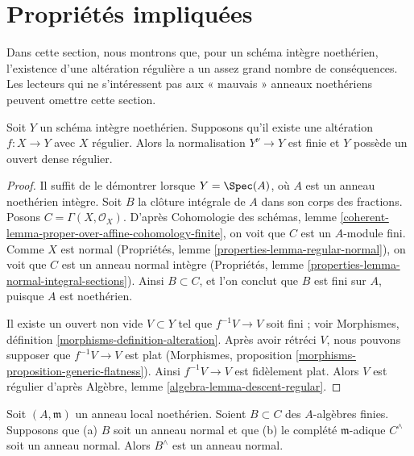 \section{Propriétés impliquées} \label{section-existence-gives}

\noindent Dans cette section, nous montrons que, pour un schéma intègre noethérien, l'existence d'une altération régulière a un assez grand nombre de conséquences. Les lecteurs qui ne s'intéressent pas aux « mauvais » anneaux noethériens peuvent omettre cette section.

\begin{lemma} \label{lemma-regular-alteration-implies} Soit $Y$ un schéma intègre noethérien. Supposons qu'il existe une altération $f : X \to Y$ avec $X$ régulier. Alors la normalisation $Y^\nu \to Y$ est finie et $Y$ possède un ouvert dense régulier. \end{lemma}

\begin{proof} Il suffit de le démontrer lorsque $Y = \Spec(A)$, où $A$ est un anneau noethérien intègre. Soit $B$ la clôture intégrale de $A$ dans son corps des fractions. Posons $C = \Gamma(X, \mathcal{O}_X)$. D'après Cohomologie des schémas, lemme \ref{coherent-lemma-proper-over-affine-cohomology-finite}, on voit que $C$ est un $A$-module fini. Comme $X$ est normal (Propriétés, lemme \ref{properties-lemma-regular-normal}), on voit que $C$ est un anneau normal intègre (Propriétés, lemme \ref{properties-lemma-normal-integral-sections}). Ainsi $B \subset C$, et l'on conclut que $B$ est fini sur $A$, puisque $A$ est noethérien.

\medskip\noindent Il existe un ouvert non vide $V \subset Y$ tel que $f^{-1}V \to V$ soit fini ; voir Morphismes, définition \ref{morphisms-definition-alteration}. Après avoir rétréci $V$, nous pouvons supposer que $f^{-1}V \to V$ est plat (Morphismes, proposition \ref{morphisms-proposition-generic-flatness}). Ainsi $f^{-1}V \to V$ est fidèlement plat. Alors $V$ est régulier d'après Algèbre, lemme \ref{algebra-lemma-descent-regular}. \end{proof}

\begin{lemma} \label{lemma-algebra-helper} Soit $(A, \mathfrak m)$ un anneau local noethérien. Soient $B \subset C$ des $A$-algèbres finies. Supposons que (a) $B$ soit un anneau normal et que (b) le complété $\mathfrak m$-adique $C^\wedge$ soit un anneau normal. Alors $B^\wedge$ est un anneau normal. \end{lemma}

